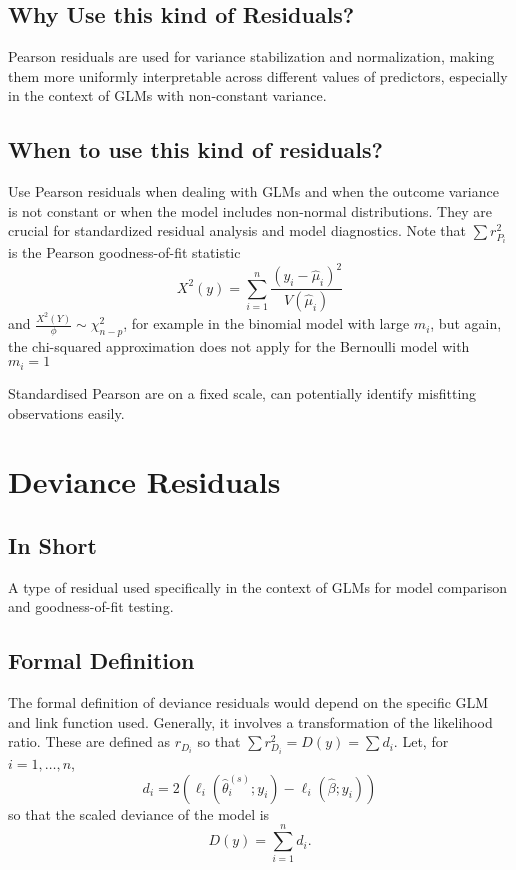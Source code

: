\documentclass{article}
\begin{document}
\subsection{Why Use this kind of Residuals?}
Pearson residuals are used for variance stabilization and normalization, making them more uniformly interpretable across different values of predictors, especially in the context of GLMs with non-constant variance.

\subsection{When to use this kind of residuals?}
Use Pearson residuals when dealing with GLMs and when the outcome variance is not constant or when the model includes non-normal distributions. They are crucial for standardized residual analysis and model diagnostics.
\newline
Note that $\sum r_{P_i}^2$ is the Pearson goodness-of-fit statistic
$$
X^2(y)=\sum_{i=1}^n \frac{\left(y_i-\widehat{\mu}_i\right)^2}{V\left(\widehat{\mu}_i\right)}
$$
and $\frac{X^2(Y)}{\phi} \sim \chi_{n-p}^2$, for example in the binomial model with large $m_i$, but again, the chi-squared approximation does not apply for the Bernoulli model with $m_i=1$

Standardised Pearson are on a fixed scale, can potentially identify misfitting observations easily.


\section{Deviance Residuals}
\subsection{In Short}
A type of residual used specifically in the context of GLMs for model comparison and goodness-of-fit testing.

\subsection{Formal Definition}
The formal definition of deviance residuals would depend on the specific GLM and link function used. Generally, it involves a transformation of the likelihood ratio.
These are defined as $r_{D_i}$ so that $\sum r_{D_i}^2=D(y)=\sum d_i$.
Let, for $i=1, \ldots, n$,
$$
d_i=2\left(\ell_i\left(\widehat{\theta}_i^{(s)} ; y_i\right)-\ell_i\left(\widehat{\beta} ; y_i\right)\right)
$$
so that the scaled deviance of the model is
$$
D(y)=\sum_{i=1}^n d_i .
$$
\end{document}
